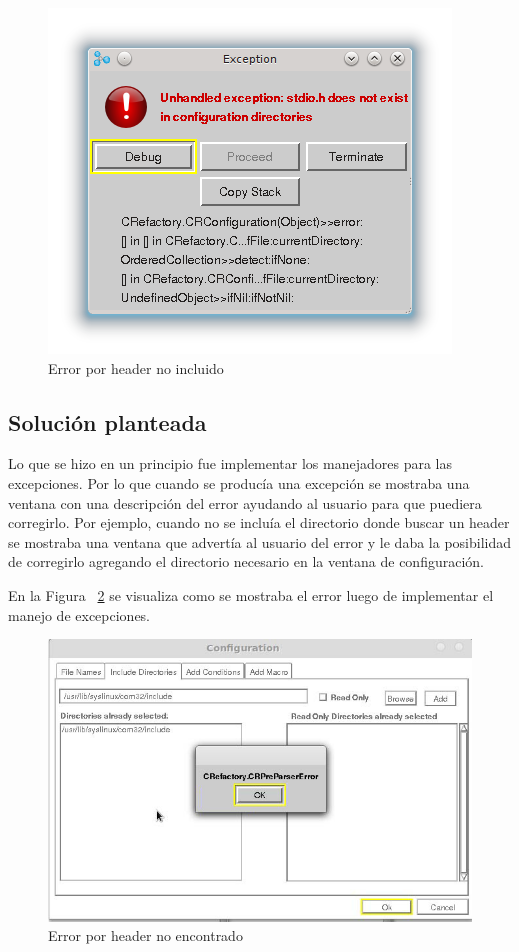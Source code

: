 \documentclass[a4paper,oneside,12pt]{article}
\begin{document}
\begin{figure}[h!]
  \centering
    \includegraphics[scale=0.85]{images/codigo_original/error_header_no_agregado.png}
     \caption{Error por header no incluido}
     \label{header_no_incluido}
\end{figure}

\subsection{Soluci\'on planteada}
Lo que se hizo en un principio fue implementar los manejadores para las excepciones. Por lo que cuando se produc\'ia una excepci\'on se mostraba una ventana con una descripci\'on del error ayudando al usuario para que puediera corregirlo. Por ejemplo, cuando no se inclu\'ia el directorio donde buscar un header se mostraba una ventana que advert\'ia al usuario del error y le daba la posibilidad de corregirlo agregando el directorio necesario en la ventana de configuraci\'on.

En la Figura ~\ref{header_no_encontrado} se visualiza como se mostraba el error luego de implementar el manejo de excepciones.

\begin{figure}[h!]
  \centering
    \includegraphics[scale=0.50]{images/codigo_modificado/error_header_no_encontrado_sin_view_error.jpg}
     \caption{Error por header no encontrado}
     \label{header_no_encontrado}
\end{figure}
\end{document}

